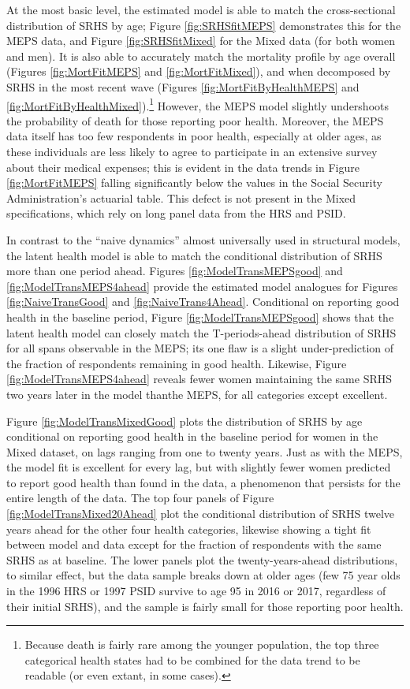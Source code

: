 \documentclass[12pt,pdftex,letterpaper]{article}
\begin{document}
At the most basic level, the estimated model is able to match the cross-sectional distribution of SRHS by age; Figure \ref{fig:SRHSfitMEPS} demonstrates this for the MEPS data, and Figure \ref{fig:SRHSfitMixed} for the Mixed data (for both women and men).  It is also able to accurately match the mortality profile by age overall (Figures \ref{fig:MortFitMEPS} and \ref{fig:MortFitMixed}), and when decomposed by SRHS in the most recent wave (Figures \ref{fig:MortFitByHealthMEPS} and \ref{fig:MortFitByHealthMixed}).\footnote{Because death is fairly rare among the younger population, the top three categorical health states had to be combined for the data trend to be readable (or even extant, in some cases).}  However, the MEPS model slightly undershoots the probability of death for those reporting poor health.  Moreover, the MEPS data itself has too few respondents in poor health, especially at older ages, as these individuals are less likely to agree to participate in an extensive survey about their medical expenses; this is evident in the data trends in Figure \ref{fig:MortFitMEPS} falling significantly below the values in the Social Security Administration's actuarial table.  This defect is not present in the Mixed specifications, which rely on long panel data from the HRS and PSID.

In contrast to the ``naive dynamics'' almost universally used in structural models, the latent health model is able to match the conditional distribution of SRHS more than one period ahead.  Figures \ref{fig:ModelTransMEPSgood} and \ref{fig:ModelTransMEPS4ahead} provide the estimated model analogues for Figures \ref{fig:NaiveTransGood} and \ref{fig:NaiveTrans4Ahead}.  Conditional on reporting good health in the baseline period, Figure \ref{fig:ModelTransMEPSgood} shows that the latent health model can closely match the T-periods-ahead distribution of SRHS for all spans observable in the MEPS; its one flaw is a slight under-prediction of the fraction of respondents remaining in good health.  Likewise, Figure \ref{fig:ModelTransMEPS4ahead} reveals fewer women maintaining the same SRHS two years later in the model thanthe MEPS, for all categories except excellent.

Figure \ref{fig:ModelTransMixedGood} plots the distribution of SRHS by age conditional on reporting good health in the baseline period for women in the Mixed dataset, on lags ranging from one to twenty years.  Just as with the MEPS, the model fit is excellent for every lag, but with slightly fewer women predicted to report good health than found in the data, a phenomenon that persists for the entire length of the data.  The top four panels of Figure \ref{fig:ModelTransMixed20Ahead} plot the conditional distribution of SRHS twelve years ahead for the other four health categories, likewise showing a tight fit between model and data except for the fraction of respondents with the same SRHS as at baseline.  The lower panels plot the twenty-years-ahead distributions, to similar effect, but the data sample breaks down at older ages (few 75 year olds in the 1996 HRS or 1997 PSID survive to age 95 in 2016 or 2017, regardless of their initial SRHS), and the sample is fairly small for those reporting poor health.
\end{document}
